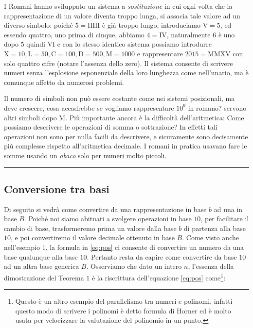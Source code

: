 I Romani hanno sviluppato un sistema a
\emph{sostituzione} in cui ogni volta che la rappresentazione di un valore
diventa troppo lunga, si associa tale valore ad un diverso simbolo: poiché $5 =
\mathrm{IIIII}$ è già troppo lungo, introduciamo $\mathrm{V} = 5$, ed essendo
quattro, uno prima di cinque, abbiamo $4 = \mathrm{IV}$, naturalmente $6$ è uno
dopo $5$ quindi $\mathrm{VI}$ e con lo stesso identico sistema possiamo
introdurre $\mathrm{X} = 10, \mathrm{L} = 50, \mathrm{C} = 100, \mathrm{D} =
500, \mathrm{M} = 1000$ e rappresentare $2015 = \mathrm{MMXV}$ con solo quattro
cifre (notare l'assenza dello zero). Il sistema consente di scrivere numeri
senza l'esplosione esponenziale della loro lunghezza come nell'unario, ma è
comunque affetto da numerosi problemi.

Il numero di simboli non può essere costante come nei sistemi posizionali, ma
deve crescere, cosa accadrebbe se vogliamo rappresentare $10^9$ in romano?
servono altri simboli dopo $\mathrm{M}$. Più importante ancora è la difficoltà
dell'aritmetica: Come possiamo descrivere le operazioni di somma o sottrazione?
In effetti tali operazioni non sono per nulla facili da descrivere, e
sicuramente sono decisamente più complesse rispetto all'aritmetica decimale. I
romani in pratica usavano fare le somme usando un \emph{abaco} solo per numeri
molto piccoli.\par
{\hfill \rule{0.9\textwidth}{0.5pt} \hfill}

\subsection{Conversione tra basi}\label{sec:conversione}

Di seguito si vedrà come convertire da una rappresentazione in base $b$ ad una
in base $B$. Poiché noi siamo abituati a svolgere operazioni in base $10$, per
facilitare il cambio di base, trasformeremo prima un valore dalla base $b$ di
partenza alla base $10$, e poi convertiremo il valore decimale ottenuto in base
$B$. Come visto anche nell'esempio $1$, la formula in \eqref{eq:pos} ci
consente di convertire un numero da una base qualunque alla base $10$. Pertanto
resta da capire come convertire da base $10$ ad un altra base generica $B$.
Osserviamo che dato un intero $n$, l'essenza della dimostrazione del Teorema $1$ è la riscrittura dell'equazione \eqref{eq:pos}
come\footnote{Questo è un altro esempio del parallelismo tra numeri e polinomi, infatti questo modo di scrivere i polinomi è detto formula di Horner ed è molto usata per velocizzare la valutazione del polinomio in un punto.}:

